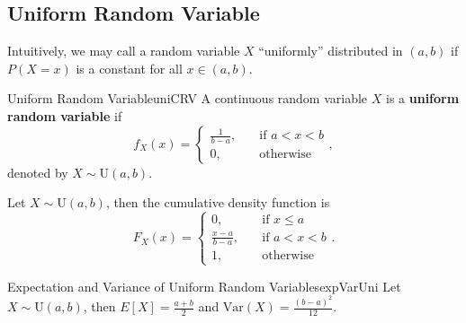 \documentclass[math]{amznotes}
\theoremstyle{remark}
\begin{document}
\subsection{Uniform Random Variable}
Intuitively, we may call a random variable $X$ ``uniformly'' distributed in $(a, b)$ if $P(X = x)$ is a constant for all $x \in (a, b)$.
\begin{dfnbox}{Uniform Random Variable}{uniCRV}
    A continuous random variable $X$ is a {\color{red} \textbf{uniform random variable}} if
    \begin{equation*}
        f_X(x) = \begin{cases}
            \frac{1}{b - a}, & \quad\textrm{if } a < x < b \\
            0, & \quad\textrm{otherwise}
        \end{cases},
    \end{equation*}
    denoted by $X \sim \mathrm{U}(a, b)$.
\end{dfnbox}
Let $X \sim \mathrm{U}(a, b)$, then the cumulative density function is
\begin{equation*}
    F_X(x) = \begin{cases}
        0, & \quad\textrm{if } x \leq a \\
        \frac{x - a}{b - a}, & \quad\textrm{if } a < x < b \\
        1, & \quad\textrm{otherwise}
    \end{cases}.
\end{equation*}
\begin{thmbox}{Expectation and Variance of Uniform Random Variables}{expVarUni}
    Let $X \sim \mathrm{U}(a, b)$, then $E[X] = \frac{a + b}{2}$ and $\mathrm{Var}(X) = \frac{(b - a)^2}{12}$.
\end{thmbox}
\end{document}
